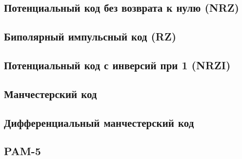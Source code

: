 \subsection{Потенциальный код без возврата к нулю (NRZ)}




\subsection{Биполярный импульсный код (RZ)}




\subsection{Потенциальный код с инверсий при 1 (NRZI)}




\subsection{Манчестерский код}




\subsection{Дифференциальный манчестерский код}




\subsection{PAM-5}


